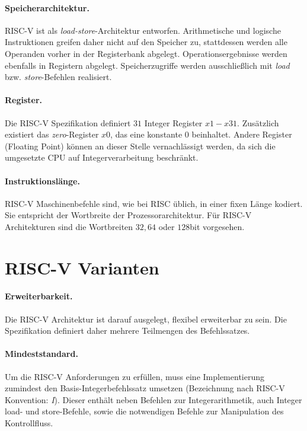 \paragraph{Speicherarchitektur.} RISC-V ist als \textit{load-store}-Architektur entworfen. Arithmetische und logische Instruktionen greifen daher nicht auf den Speicher zu, stattdessen werden alle Operanden vorher in der Registerbank abgelegt. Operationsergebnisse werden ebenfalls in Registern abgelegt. Speicherzugriffe werden ausschließlich mit \textit{load} bzw. \textit{store}-Befehlen realisiert.

\paragraph{Register.} Die RISC-V Spezifikation definiert $31$ Integer Register $x1 - x31$. Zusätzlich existiert das \textit{zero}-Register $x0$, das eine konstante $0$ beinhaltet. Andere Register (Floating Point) können an dieser Stelle vernachlässigt werden, da sich die umgesetzte CPU auf Integerverarbeitung beschränkt.

\paragraph{Instruktionslänge.} RISC-V Maschinenbefehle sind, wie bei RISC üblich, in einer fixen Länge kodiert. Sie entspricht der Wortbreite der Prozessorarchitektur. Für RISC-V Architekturen sind die Wortbreiten $32, 64$ oder $128$bit vorgesehen.

\section{RISC-V Varianten}

\paragraph{Erweiterbarkeit.} Die RISC-V Architektur ist darauf ausgelegt, flexibel erweiterbar zu sein. Die Spezifikation definiert daher mehrere Teilmengen des Befehlssatzes. \cite[p. 4]{RISC}

\paragraph{Mindeststandard.} Um die RISC-V Anforderungen zu erfüllen, muss eine Implementierung zumindest den Basis-Integerbefehlssatz umsetzen (Bezeichnung nach \mbox{RISC-V} Konvention: \textit{I}). Dieser enthält neben Befehlen zur Integerarithmetik, auch Integer load- und store-Befehle, sowie die notwendigen Befehle zur Manipulation des Kontrollfluss.

